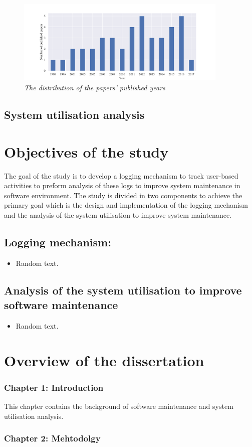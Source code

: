 \begin{figure}[!htb] %
	\centering %
	\includegraphics[width=0.9\textwidth]{Images/Chapter1/Background/Ronga2018.pdf}
	\caption[The distribution of the papers’ published years]
	{\textit{The distribution of the papers’ published years \cite{Rong2018a}}} \label{fig:CH1_PushblisedPapers}
\end{figure} 

\clearpage

\subsection{System utilisation analysis}

\clearpage

\section{Objectives of the study}
The goal of the study is to develop a logging mechanism to track user-based
activities to preform analysis of these logs to improve system maintenance in
software environment. The study is divided in two components to achieve the
primary goal which is the design and implementation of the logging mechanism
and the analysis of the system utilisation to improve system maintenance.

\subsection{Logging mechanism:}
\begin{itemize}
	\item Random text.
\end{itemize}

\subsection{Analysis of the system utilisation to improve software maintenance}
\begin{itemize}
	\item Random text.
\end{itemize}

\section{Overview of the dissertation}
\subsubsection{Chapter 1: Introduction}
This chapter contains the background of software maintenance and system
utilisation analysis.
\subsubsection{Chapter 2: Mehtodolgy}